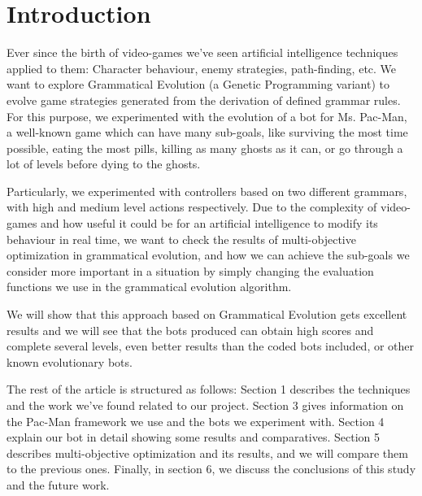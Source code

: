 \documentclass{llncs}
\newcommand{\paco}{Pac-Man }
\begin{document}

%
\section{Introduction}
\label{sec:intro}
%


Ever since the birth of video-games we’ve seen artificial intelligence techniques applied to them: Character behaviour, enemy strategies, path-finding, etc. We want to explore Grammatical Evolution (a Genetic Programming variant) to evolve game strategies generated from the derivation of defined grammar rules. For this purpose, we experimented with the evolution of a bot for Ms. Pac-Man, a well-known game which can have many sub-goals, like surviving the most time possible, eating the most pills, killing as many ghosts as it can, or go through a lot of levels before dying to the ghosts.

Particularly, we experimented with controllers based on two different grammars, with high and medium level actions respectively. Due to the complexity of video-games and how useful it could be for an artificial intelligence to modify its behaviour in real time, we want to check the results of multi-objective optimization in grammatical evolution, and how we can achieve the sub-goals we consider more important in a situation by simply changing the evaluation functions we use in the grammatical evolution algorithm.

We will show that this approach based on Grammatical Evolution gets excellent results and we will see that the bots produced can obtain high scores and complete several levels, even better results than the coded bots included, or other known evolutionary bots.

The rest of the article is structured as follows: Section 1 describes the techniques and the work we’ve found related to our project. Section 3 gives information on the \paco framework we use and the bots we experiment with. Section 4 explain our bot in detail showing some results and comparatives. Section 5 describes multi-objective optimization and its results, and we will compare them to the previous ones. Finally, in section 6, we discuss the conclusions of this study and the future work.
\end{document}
